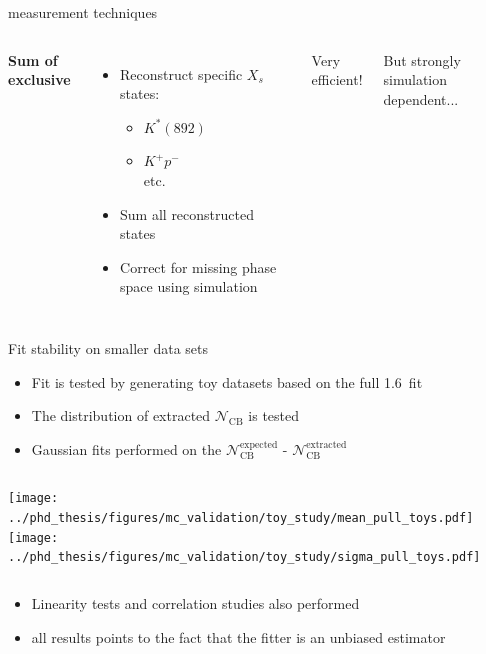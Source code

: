 \documentclass[xcolor=dvipsnames]{beamer}
\begin{document}
\begin{frame}{\safeBtoXsgamma measurement techniques}
   \scriptsize
   \begin{columns}
      \centering
      
      \centering
      \textbf{Sum of exclusive}
      \begin{itemize}
         \item Reconstruct specific $X_s$ states:
         \begin{itemize}
            \scriptsize
            \item $K^*(892)$
            \item $K^+p^-$\\
            etc.
         \end{itemize} 
         \item Sum all reconstructed states
         \item Correct for missing phase space using simulation
      \end{itemize}

      Very efficient!

      But strongly simulation dependent...


   \end{columns}
\end{frame}

\begin{frame}{Fit stability on smaller data sets}
   \scriptsize\centering
      \begin{itemize}
         \item Fit is tested by generating toy datasets based on the full 1.6~\invab fit
         \item The distribution of extracted $\mathcal{N}_{\mathrm{CB}}$ is tested
         \item Gaussian fits performed on the $\mathcal{N}_{\mathrm{CB}}^{\mathrm{expected}}$ - $\mathcal{N}_{\mathrm{CB}}^{\mathrm{extracted}}$
      \end{itemize}
   
   \begin{columns}
      \texttt{[image: ../phd\_thesis/figures/mc\_validation/toy\_study/mean\_pull\_toys.pdf]}
      \texttt{[image: ../phd\_thesis/figures/mc\_validation/toy\_study/sigma\_pull\_toys.pdf]}
   \end{columns}
   
   \begin{itemize}
      \item Linearity tests and correlation studies also performed
      \item[\ra] all results points to the fact that the fitter is an unbiased estimator
   \end{itemize}
   
   
   
   
   
   \end{frame}
\end{document}
